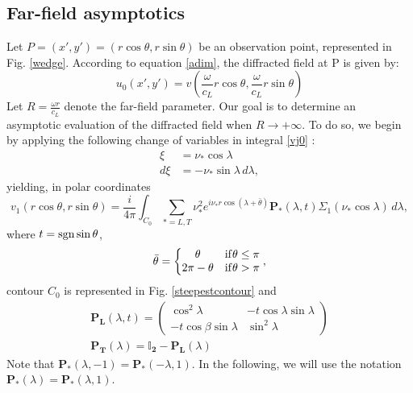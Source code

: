 \subsection{Far-field asymptotics}
\label{farfield}
Let $P=(x',y')=(r\cos\theta,r\sin\theta)$ be an observation point, represented in Fig. \ref{wedge}. According to equation \eqref{adim}, the diffracted field at P is given by:
\begin{equation}
u_0(x',y')=v(\frac{\omega}{c_L}r\cos\theta,\frac{\omega}{c_L}r\sin\theta)
\end{equation}
Let $R=\frac{\omega r}{c_L}$ denote the far-field parameter. Our goal is to determine an asymptotic evaluation of the diffracted field when $R\rightarrow +\infty$. To do so, we begin by applying the following change of variables in integral \eqref{vj0} :
\begin{equation}
\begin{split}
 \xi&=\nu_*\cos\lambda \\
 d\xi&=-\nu_*\sin\lambda\, d\lambda,
\end{split}
\label{changevar2}
\end{equation}
yielding, in polar coordinates
\begin{equation}
v_1(r\cos\theta,r\sin\theta)=\frac{i}{4\pi} \int_{C_0}\sum_{*=L,T}\nu_*^2 e^{i\nu_*r\cos(\lambda+\bar{\theta})}\mathbf{ P_*}(\lambda,t)\Sigma_1(\nu_*\cos\lambda) \, d \lambda,
\label{v1pol}
\end{equation}
where $t=\rm sgn \sin \theta$,
\begin{equation}
\bar{\theta}=\left\{
\begin{matrix}
\theta & \rm if \theta \leq \pi \\
2\pi-\theta & \rm if \theta>\pi
\end{matrix}
\right. ,
\label{C3:thetatilde}
\end{equation}
contour $C_0$ is represented in Fig. \ref{steepestcontour} and
\begin{gather}
\mathbf{P_L}(\lambda,t)=
\begin{pmatrix}
\cos^2\lambda & -t\cos\lambda\sin\lambda \\
-t\cos\beta\sin\lambda & \sin^2\lambda
\end{pmatrix}\\
\mathbf{P_T}(\lambda)=\mathbf{\mathbb{I}_2}-\mathbf{P_L}(\lambda)
\end{gather}
Note that $\mathbf{P_*}(\lambda,-1)=\mathbf{P_*}(-\lambda,1)$. In the following, we will use the notation $\mathbf{P_*}(\lambda)=\mathbf{P_*}(\lambda,1)$.

